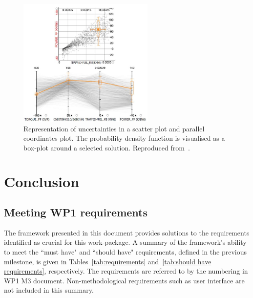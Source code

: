 \documentclass[a4paper]{article}
\begin{document}
\begin{figure}
\centering
\includegraphics[width=0.6\textwidth]{figures/visualisation.jpg}
\caption{Representation of uncertainties in a scatter plot and parallel coordinates plot. The probability density function is visualised as a box-plot around a selected solution. Reproduced from~\cite{Berger2011uncertainty}.}
\label{fig:visualisation}
\end{figure}

\section{Conclusion}
\label{sec:conclusion}
\subsection{Meeting WP1 requirements}
The framework presented in this document provides solutions to the requirements identified as crucial for this work-package. A summary of the framework's ability to meet the ``must have" and ``should have" requirements, defined in the previous milestone, is given in Tables~\ref{tab:requirements} and~\ref{tab:should have requirements}, respectively. The requirements are referred to by the numbering in WP1 M3 document. Non-methodological requirements such as user interface are not included in this summary.
\end{document}
